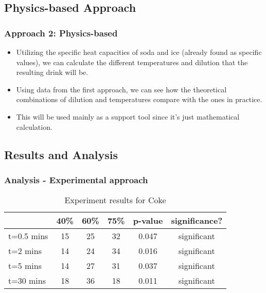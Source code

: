 \documentclass[compress,handout,10pt]{beamer}
\let\olditem\item
\renewcommand{\item}{\setlength{\itemsep}{0.5\baselineskip}\olditem}
\begin{document}
\subsection{Physics-based Approach}
\begin{frame}
    \frametitle{Approach 2: Physics-based}

\begin {itemize}
\item Utilizing the specific heat capacities of soda and ice (already found as specific values), we can calculate the different temperatures and dilution that the resulting drink will be.
\item Using data from the first approach, we can see how the theoretical combinations of dilution and temperatures compare with the ones in practice.
\item This will be used mainly as a support tool since it's just mathematical calculation.
\end{itemize}

\end{frame}
 
\subsection{Results and Analysis}
\begin{frame}
    \frametitle{Analysis - Experimental approach}

\begin{table}[ h]
\centering
\begin{tabular}{ l || c|c|c||c|c }
  &40\% &60\% & 75\% &p-value &significance? \\
\hline  
t=0.5 mins & 15 & 25 & 32 & 0.047&significant\\ 
\hline  
t=2 mins & 14 & 24 & 34&0.016&significant\\ 
\hline  
t=5 mins & 14 & 27 & 31&0.037&significant\\ 
\hline  
t=30 mins & 18 & 36 & 18&0.011&significant\\ 
\hline  
   
 \end{tabular}

\caption{Experiment results for Coke}

\end{table}
\end{frame}
\end{document}

